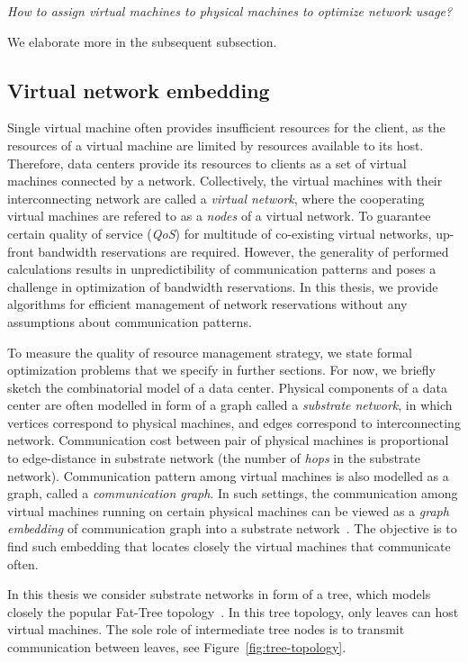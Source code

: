 \begin{center}
  \emph{How to assign virtual machines to physical machines to optimize network
  usage?}
\end{center}

We elaborate more in the subsequent subsection.

\subsection{Virtual network embedding}

Single virtual machine often provides insufficient resources for the client, as the resources of a virtual machine are limited by resources available to its host.
Therefore, data centers provide its resources to clients as a set
of virtual machines connected by a network.
Collectively, the virtual machines with their interconnecting network are called a \emph{virtual network}, where the cooperating virtual machines are refered to as a \emph{nodes} of a virtual network.
To guarantee certain quality of service (\emph{QoS}) for multitude of co-existing virtual networks, up-front bandwidth reservations are required.
However, the generality of performed calculations results in unpredictibility of communication patterns and poses a challenge in optimization of bandwidth reservations.
In this thesis, we provide algorithms for efficient management of network reservations without any assumptions about communication patterns.

To measure the quality of resource management strategy, we state formal optimization problems that we specify in further sections.
For now, we briefly sketch the combinatorial model of a data center.
Physical components of a data center are often modelled in form of a graph called a \emph{substrate network}, in which vertices correspond to physical machines, and edges correspond to interconnecting network.
Communication cost between pair of physical machines is proportional to edge-distance in substrate network (the number of \emph{hops} in the substrate network).
Communication pattern among virtual machines is also modelled as a graph, called a \emph{communication graph}.
In such settings, the communication among virtual machines running on certain physical machines can be viewed as a \emph{graph embedding} of communication graph into a substrate network~\cite{Goyal2008,gupta2001provisioning}.
The objective is to find such embedding that locates closely the virtual machines that communicate often.

In this thesis we consider substrate networks in form of a tree, which models closely the popular Fat-Tree topology~\cite{fat-trees}.
In this tree topology, only leaves can host virtual machines.
The sole role of intermediate tree nodes is to transmit communication between leaves, see Figure~\ref{fig:tree-topology}.


